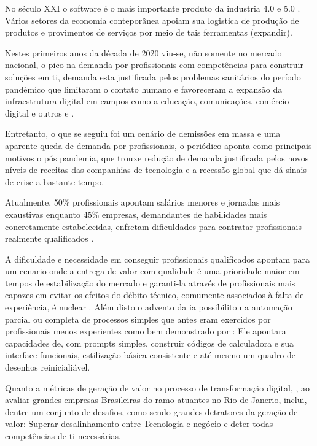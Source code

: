 
    No século XXI o software é o mais importante produto da industria 4.0 e 5.0 .
    Vários setores da economia conteporânea apoiam sua logistica de produção de produtos e 
    provimentos de serviços por meio de tais ferramentas (expandir).

    Nestes primeiros anos da década de 2020 viu-se, não somente no
    mercado nacional, o pico na demanda por profissionais com
    competências para construir soluções em \ac{ti}, demanda esta justificada pelos
    problemas sanitários do período pandêmico que limitaram o contato humano e favoreceram a expansão
    da infraestrutura digital em campos como a educação, comunicações,
    comércio digital e outros \cite{vieira2024impactos} e \cite{carreira2023}.
    
    Entretanto, o que se seguiu foi um cenário de demissões em massa e uma aparente
    queda de demanda por profissionais, o periódico   aponta
    como principais motivos o pós pandemia, que trouxe redução de demanda justificada
    pelos novos níveis de receitas das companhias de tecnologia e a recessão global
    que dá sinais de crise a bastante tempo.

    Atualmente, 50\% profissionais apontam salários menores e
    jornadas mais exaustivas enquanto 45\% empresas, demandantes de habilidades mais
    concretamente estabelecidas, enfretam dificuldades para contratar profissionais
    realmente qualificados \cite{cnn2024}.

    A dificuldade e necessidade em conseguir profissionais qualificados apontam para
    um cenario onde a entrega de valor com qualidade é uma prioridade maior em tempos de
    estabilização do mercado e garanti-la através de profissionais mais capazes
    em evitar os efeitos do débito técnico, comumente associados à falta de experiência,
    é nuclear \cite[p.~131 et all.]{beltrao2020}. Além disto o advento da \ac{ia} possibilitou
    a automação parcial ou completa de processos simples que antes eram exercidos por
    profissionais menos experientes como bem demonstrado por : Ele
    apontara capacidades de, com prompts simples, construir códigos de calculadora
    e sua interface funcionais, estilização básica consistente e até mesmo um quadro de desenhos
    reinicialiável.

    Quanto a métricas de geração de valor no processo de transformação digital,
    , ao avaliar grandes empresas Brasileiras
    do ramo atuantes no Rio de Janerio, inclui, dentre um conjunto de desafios, como
    sendo grandes detratores da geração de valor: Superar desalinhamento entre Tecnologia e negócio
    e deter todas competências de \ac{ti} necessárias.

